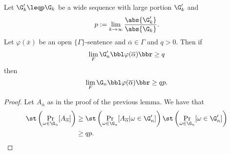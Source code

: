 \begin{lemm}\label{lemmporup}
Let $\G_k'\leqp \G_k$ be a wide sequence with large portion $\G_k'$ and 
\[p:=\lim_{k\to\infty}\frac{\abs{\G_k'}}{\abs{\G_k}}.\]
Let $\varphi(\overline x)$ be an open $\{\Gamma\}$-sentence and $\overline \alpha\in\Gamma$ and $q>0$. Then if 
\[\lim_F\G_n'\bbl\varphi(\overline \alpha)\bbr\geq q \]
then
\[\lim_F\G_n\bbl\varphi(\overline \alpha)\bbr\geq qp.\]
\end{lemm}
\begin{proof}
Let $A_{\overline \alpha}$ as in the proof of the previous lemma. We have that
\begin{align}
\st\left(\Pr_{\omega\in\G_n}[A_{\overline \alpha}]\right)&\geq
\st\left(\Pr_{\omega\in\G_n}[A_{\overline \alpha}|\omega\in\G_n']\right)\st\left(\Pr_{\omega\in\G_n}[\omega \in \G_n']\right)\\
&\geq qp.
\end{align}
\end{proof}
